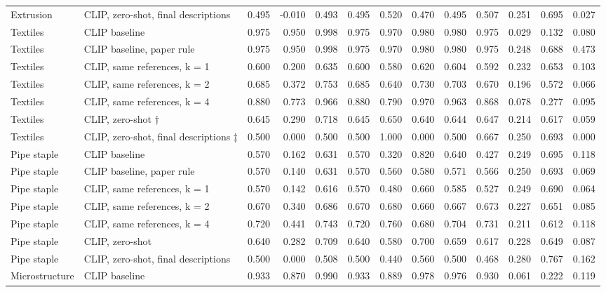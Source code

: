 \begin{table}
\begin{tabular}[t]{llrrrrrrrrrrr}
Extrusion & CLIP, zero-shot, final descriptions & 0.495 & -0.010 & 0.493 & 0.495 & 0.520 & 0.470 & 0.495 & 0.507 & 0.251 & 0.695 & 0.027\\
Textiles & CLIP baseline & 0.975 & 0.950 & 0.998 & 0.975 & 0.970 & 0.980 & 0.980 & 0.975 & 0.029 & 0.132 & 0.080\\
Textiles & CLIP baseline, paper rule & 0.975 & 0.950 & 0.998 & 0.975 & 0.970 & 0.980 & 0.980 & 0.975 & 0.248 & 0.688 & 0.473\\
\addlinespace
Textiles & CLIP, same references, k = 1 & 0.600 & 0.200 & 0.635 & 0.600 & 0.580 & 0.620 & 0.604 & 0.592 & 0.232 & 0.653 & 0.103\\
Textiles & CLIP, same references, k = 2 & 0.685 & 0.372 & 0.753 & 0.685 & 0.640 & 0.730 & 0.703 & 0.670 & 0.196 & 0.572 & 0.066\\
Textiles & CLIP, same references, k = 4 & 0.880 & 0.773 & 0.966 & 0.880 & 0.790 & 0.970 & 0.963 & 0.868 & 0.078 & 0.277 & 0.095\\
Textiles & CLIP, zero-shot † & 0.645 & 0.290 & 0.718 & 0.645 & 0.650 & 0.640 & 0.644 & 0.647 & 0.214 & 0.617 & 0.059\\
Textiles & CLIP, zero-shot, final descriptions ‡ & 0.500 & 0.000 & 0.500 & 0.500 & 1.000 & 0.000 & 0.500 & 0.667 & 0.250 & 0.693 & 0.000\\
\addlinespace
Pipe staple & CLIP baseline & 0.570 & 0.162 & 0.631 & 0.570 & 0.320 & 0.820 & 0.640 & 0.427 & 0.249 & 0.695 & 0.118\\
Pipe staple & CLIP baseline, paper rule & 0.570 & 0.140 & 0.631 & 0.570 & 0.560 & 0.580 & 0.571 & 0.566 & 0.250 & 0.693 & 0.069\\
Pipe staple & CLIP, same references, k = 1 & 0.570 & 0.142 & 0.616 & 0.570 & 0.480 & 0.660 & 0.585 & 0.527 & 0.249 & 0.690 & 0.064\\
Pipe staple & CLIP, same references, k = 2 & 0.670 & 0.340 & 0.686 & 0.670 & 0.680 & 0.660 & 0.667 & 0.673 & 0.227 & 0.651 & 0.085\\
Pipe staple & CLIP, same references, k = 4 & 0.720 & 0.441 & 0.743 & 0.720 & 0.760 & 0.680 & 0.704 & 0.731 & 0.211 & 0.612 & 0.118\\
\addlinespace
Pipe staple & CLIP, zero-shot & 0.640 & 0.282 & 0.709 & 0.640 & 0.580 & 0.700 & 0.659 & 0.617 & 0.228 & 0.649 & 0.087\\
Pipe staple & CLIP, zero-shot, final descriptions & 0.500 & 0.000 & 0.508 & 0.500 & 0.440 & 0.560 & 0.500 & 0.468 & 0.280 & 0.767 & 0.162\\
Microstructure & CLIP baseline & 0.933 & 0.870 & 0.990 & 0.933 & 0.889 & 0.978 & 0.976 & 0.930 & 0.061 & 0.222 & 0.119\\

\end{tabular}
\end{table}
